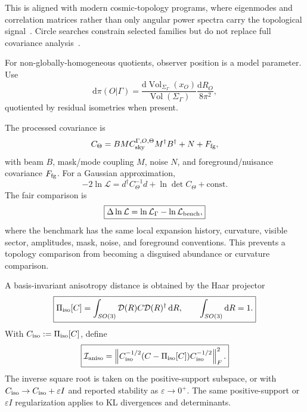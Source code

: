 \documentclass[
  aps,
  prd,
  reprint,
  superscriptaddress,
  floatfix,
  nofootinbib,
  longbibliography
]{revtex4-2}
\theoremstyle{plain}
\theoremstyle{definition}
\theoremstyle{remark}
\newcommand{\dd}{\mathrm d}
\newcommand{\Vol}{\operatorname{Vol}}
\newcommand{\Ical}{\mathcal I}
\newcommand{\Lcal}{\mathcal L}
\begin{document}
This is aligned with modern cosmic-topology programs, where eigenmodes and correlation matrices rather than only angular power spectra carry the topological signal~\cite{Levin2002,Aurich2005,Eskilt2024,Samandar2025}.  Circle searches constrain selected families but do not replace full covariance analysis~\cite{Planck2015Topology,Saha2025Lens}.

For non-globally-homogeneous quotients, observer position is a model parameter.  Use
\begin{equation}
\dd\pi(O|\Gamma)=\frac{\dd\Vol_{\Sigma_\Gamma}(x_O)}{\Vol(\Sigma_\Gamma)}\frac{\dd R_O}{8\pi^2},
\label{eq:observer_prior}
\end{equation}
quotiented by residual isometries when present.

The processed covariance is
\begin{equation}
C_\Theta=BM C_{\rm sky}^{\Gamma,O,\Theta}M^\dagger B^\dagger+N+F_{\rm fg},
\label{eq:processed_cov}
\end{equation}
with beam \(B\), mask/mode coupling \(M\), noise \(N\), and foreground/nuisance covariance \(F_{\rm fg}\).  For a Gaussian approximation,
\begin{equation}
-2\ln\Lcal=d^\dagger C_\Theta^{-1}d+\ln\det C_\Theta+\mathrm{const}.
\label{eq:likelihood}
\end{equation}
The fair comparison is
\begin{equation}
\boxed{
\Delta\ln\Lcal=\ln\Lcal_\Gamma-\ln\Lcal_{\rm bench},
}
\label{eq:benchmark}
\end{equation}
where the benchmark has the same local expansion history, curvature, visible sector, amplitudes, mask, noise, and foreground conventions.  This prevents a topology comparison from becoming a disguised abundance or curvature comparison.

A basis-invariant anisotropy distance is obtained by the Haar projector
\begin{equation}
\boxed{
\Pi_{\rm iso}[C]=\int_{SO(3)}\mathcal D(R)C\mathcal D(R)^\dagger\,\dd R,
\qquad \int_{SO(3)}\dd R=1.
}
\label{eq:Haar}
\end{equation}
With \(C_{\rm iso}:=\Pi_{\rm iso}[C]\), define
\begin{equation}
\boxed{
\Ical_{\rm aniso}
=\left\|C_{\rm iso}^{-1/2}(C-\Pi_{\rm iso}[C])C_{\rm iso}^{-1/2}\right\|_F^2.
}
\label{eq:aniso}
\end{equation}
The inverse square root is taken on the positive-support subspace, or with \(C_{\rm iso}\to C_{\rm iso}+\varepsilon I\) and reported stability as \(\varepsilon\to0^+\).  The same positive-support or \(\varepsilon I\) regularization applies to KL divergences and determinants.
\end{document}
